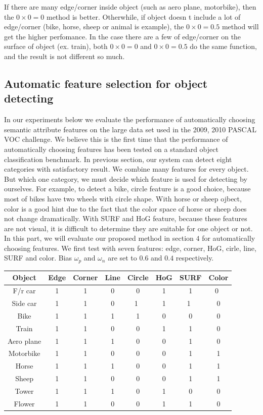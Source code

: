 If there are many edge/corner inside object (such as aero plane,
motorbike), then the $0\times 0=0$ method is better. Otherwhile, if object
doesn t include a lot of edge/corner (bike, horse, sheep or animal is
example), the $0\times 0=0.5$ method will get the higher perfomance. In the
case there are a few of edge/corner on the surface of object (ex.
train), both $0\times 0=0$ and $0\times 0=0.5$ do the same function, and the result
is not different so much.
\subsection{Automatic feature selection for object detecting}
In our experiments below we evaluate the performance of
automatically choosing semantic attribute features on the large data
set used in the 2009, 2010 PASCAL VOC challenge. We believe this
is the first time that the performance of automatically choosing
features has been tested on a standard object classification
benchmark.
In previous section, our system can detect eight categories with
satisfactory result. We combine many features for every object. But
which one category, we must decide which feature is used for
detecting by ourselves. For example, to detect a bike, circle feature is
a good choice, because most of bikes have two wheels with circle
shape. With horse or sheep ojbect, color is a good hint 
due to the fact that the color space of horse or sheep does not change dramatically. With SURF and HoG
feature, because these features are not visual, it is difficult to determine they are suitable for one object or not. In this part, we will evaluate our proposed method in section $4$ for automatically choosing features. We first test with seven features:
edge, corner, HoG, cirle, line, SURF and color. Bias $\omega_p$ and $\omega_n$ are set to $0.6$ and $0.4$ respectively.
\begin{table}[htbp]
\small
\centering
\begin{tabular}{|c|c|c|c|c|c|c|c|}%
    \hline
    Object & Edge & Corner & Line & Circle & HoG & SURF & Color \\ \hline
	F/r car & 1 & 1 & 0 & 0 & 1 & 1 & 0  \\ \hline
	Side car & 1 & 1 & 0 & 1 & 1 &  1 & 0  \\ \hline
	Bike & 1 & 1 & 1 & 1 & 0 & 0 & 0  \\ \hline
	Train & 1 & 1 & 0 & 0 & 1 & 1 & 0  \\ \hline
	Aero plane & 1 & 1  & 1 & 0 & 0 & 1 & 0  \\ \hline
	Motorbike & 1  & 1 & 0 & 0 & 0 & 1 & 1  \\ \hline
	Horse & 1 &  1 & 1 & 0 & 0 & 1 & 1  \\ \hline
	Sheep & 1 & 1 & 0 & 0 & 0 & 1 & 1  \\ \hline
	Tower & 1 & 1 & 1 & 0 & 1 & 0 & 0  \\ \hline
	Flower & 1 & 1 & 0 & 0 & 1 & 1 & 0  \\ \hline
\end{tabular}
\label{table:auto_feature_select}
\end{table}

